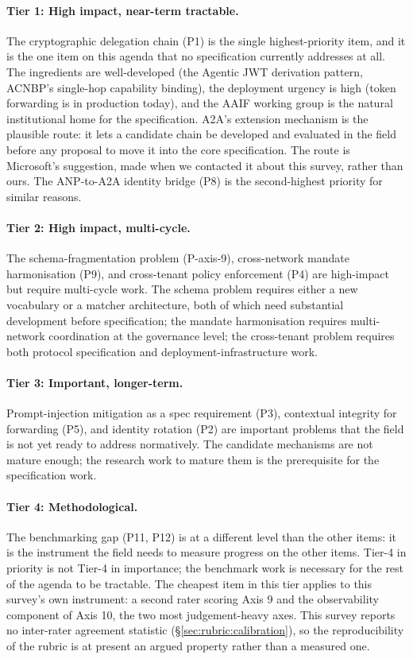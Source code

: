 \paragraph{Tier 1: High impact, near-term
tractable.}
The cryptographic delegation chain (P1) is the
single highest-priority item, and it is the one item on
this agenda that no specification currently addresses at
all. The ingredients are well-developed (the Agentic JWT
derivation pattern, ACNBP's single-hop capability
binding), the deployment urgency is high (token forwarding
is in production today), and the AAIF working group
is the natural institutional home for the
specification. A2A's extension mechanism is the
plausible route: it lets a candidate chain be
developed and evaluated in the field before any
proposal to move it into the core specification. The route
is Microsoft's suggestion, made when we contacted it about
this survey, rather than ours. The ANP-to-A2A identity
bridge (P8) is the second-highest priority for
similar reasons.

\paragraph{Tier 2: High impact, multi-cycle.}
The schema-fragmentation problem
(P-axis-9), cross-network mandate harmonisation
(P9), and cross-tenant policy enforcement (P4)
are high-impact but require multi-cycle work.
The schema problem requires either a new
vocabulary or a matcher architecture, both of
which need substantial development before
specification; the mandate harmonisation
requires multi-network coordination at the
governance level; the cross-tenant problem
requires both protocol specification and
deployment-infrastructure work.

\paragraph{Tier 3: Important, longer-term.}
Prompt-injection mitigation as a spec
requirement (P3), contextual integrity for
forwarding (P5), and identity rotation (P2) are
important problems that the field is not yet
ready to address normatively. The candidate
mechanisms are not mature enough; the research
work to mature them is the prerequisite for the
specification work.

\paragraph{Tier 4: Methodological.}
The benchmarking gap (P11, P12) is at a
different level than the other items: it is
the instrument the field needs to measure
progress on the other items. Tier-4 in
priority is not Tier-4 in importance; the
benchmark work is necessary for the rest of
the agenda to be tractable. The cheapest item in
this tier applies to this survey's own instrument: a
second rater scoring Axis 9 and the observability
component of Axis 10, the two most judgement-heavy
axes. This survey reports no inter-rater agreement
statistic (\S\ref{sec:rubric:calibration}), so the
reproducibility of the rubric is at present an
argued property rather than a measured one.

